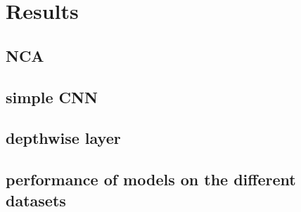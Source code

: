 
\chapter{Results} %
\label{Chapter5} %

\section{NCA}
\section{simple CNN}
\section{depthwise layer}
\section{performance of models on the different datasets}
